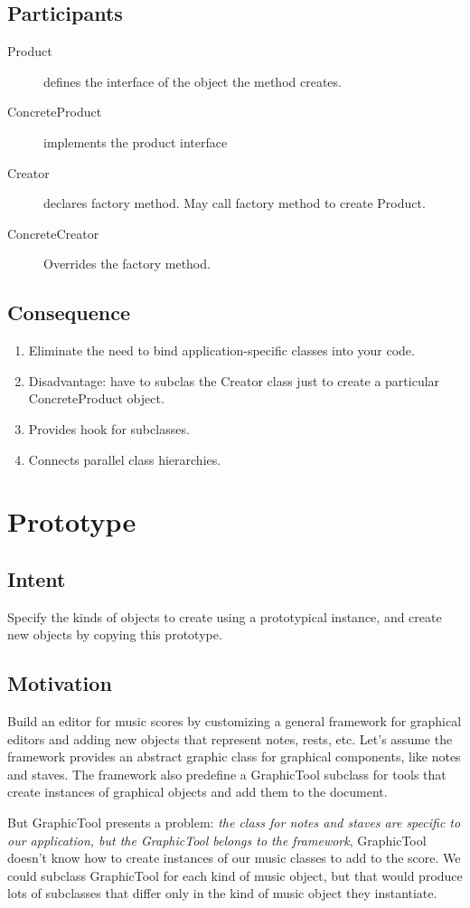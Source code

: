 \documentclass[11pt, a4paper]{book}
\begin{document}
\subsection{Participants}
\begin{description}
\item [Product] defines the interface of the object the method creates.
\item [ConcreteProduct] implements the product interface
\item [Creator] declares factory method. May call factory method to create
Product.
\item [ConcreteCreator] Overrides the factory method.
\end{description}
\subsection{Consequence}
\begin{enumerate}
    \item Eliminate the need to bind application-specific classes into your code.
    \item Disadvantage: have to subclas the Creator class just to create a
    particular ConcreteProduct object.
    \item Provides hook for subclasses.
    \item Connects parallel class hierarchies.
\end{enumerate}
\section{Prototype}
\subsection{Intent}
Specify the kinds of objects to create using a prototypical instance, and create
new objects by copying this prototype.
\subsection{Motivation}
Build an editor for music scores by customizing a general framework for
graphical editors and adding new objects that represent notes, rests, etc. Let's
assume the framework provides an abstract graphic class for graphical
components, like notes and staves. The framework also predefine a GraphicTool
subclass for tools that create instances of graphical objects and add them to
the document.

But GraphicTool presents a problem: \emph{the class for notes and staves are specific
to our application, but the GraphicTool belongs to the framework}, GraphicTool
doesn't know how to create instances of our music classes to add to the score.
We could subclass GraphicTool for each kind of music object, but that would
produce lots of subclasses that differ only in the kind of music object they
instantiate.
\end{document}

